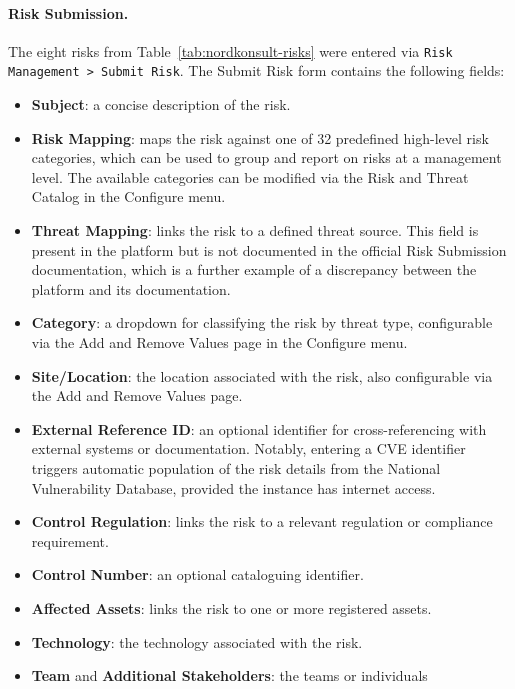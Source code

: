 \paragraph{Risk Submission.}
The eight risks from Table~\ref{tab:nordkonsult-risks} were entered via
\texttt{Risk Management > Submit Risk}. The Submit Risk form contains the following
fields:
 
\begin{itemize}
    \item \textbf{Subject}: a concise description of the risk.
    \item \textbf{Risk Mapping}: maps the risk against one of 32 predefined high-level
          risk categories, which can be used to group and report on risks at a management
          level. The available categories can be modified via the Risk and Threat Catalog
          in the Configure menu.
    \item \textbf{Threat Mapping}: links the risk to a defined threat source. This field
          is present in the platform but is not documented in the official Risk Submission
          documentation, which is a further example of a discrepancy between the platform
          and its documentation.
    \item \textbf{Category}: a dropdown for classifying the risk by threat type,
          configurable via the Add and Remove Values page in the Configure menu.
    \item \textbf{Site/Location}: the location associated with the risk, also
          configurable via the Add and Remove Values page.
    \item \textbf{External Reference ID}: an optional identifier for cross-referencing
          with external systems or documentation. Notably, entering a CVE identifier
          triggers automatic population of the risk details from the National
          Vulnerability Database, provided the instance has internet access.    \item \textbf{Control Regulation}: links the risk to a relevant regulation or
          compliance requirement.
    \item \textbf{Control Number}: an optional cataloguing identifier.
    \item \textbf{Affected Assets}: links the risk to one or more registered assets.
    \item \textbf{Technology}: the technology associated with the risk.
    \item \textbf{Team} and \textbf{Additional Stakeholders}: the teams or individuals

\end{itemize}
